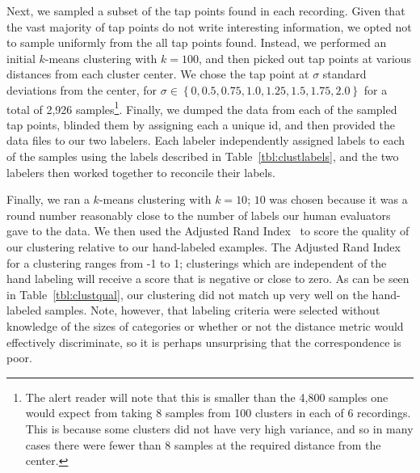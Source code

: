 Next, we sampled a subset of the tap points found in each recording.
Given that the vast majority of tap points do not write interesting
information, we opted not to sample uniformly from the all tap points
found. Instead, we performed an initial $k$-means clustering with $k =
100$, and then picked out tap points at various distances from each
cluster center. We chose the tap point at $\sigma$
standard deviations from the center, for $\sigma \in \left\{0, 0.5,
0.75, 1.0, 1.25, 1.5, 1.75, 2.0 \right\}$ for a total of 2,926
samples\footnote{The alert reader will note that this is smaller than
the 4,800 samples one would expect from taking 8 samples from 100
clusters in each of 6 recordings. This is because some clusters did not
have very high variance, and so in many cases there were fewer than 8
samples at the required distance from the center.}. Finally, we dumped
the data from each of the sampled tap points, blinded them by assigning
each a unique id, and then provided the data files to our two labelers.
Each labeler independently assigned labels to each of the samples using
the labels described in Table~\ref{tbl:clustlabels}, and the two
labelers then worked together to reconcile their labels.  

Finally, we ran a $k$-means clustering with $k = 10$; $10$ was chosen
because it was a round number reasonably close to the number of labels our
human evaluators gave to the data. We then used the Adjusted Rand
Index~\cite{Hubert:1985zr} to score the quality of our clustering
relative to our hand-labeled examples. The Adjusted Rand Index for a
clustering ranges from -1 to 1; clusterings which are independent of the
hand labeling will receive a score that is negative or close to zero. As
can be seen in Table~\ref{tbl:clustqual}, our clustering did not match 
up very well on the hand-labeled samples.  Note, however, that labeling
criteria were selected without knowledge of the sizes of categories or
whether or not the distance metric would effectively discriminate, so it
is perhaps unsurprising that the correspondence is poor.

